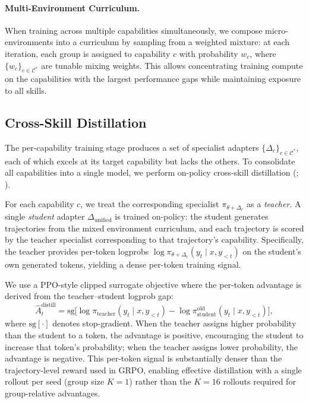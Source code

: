 \paragraph{Multi-Environment Curriculum.}
When training across multiple capabilities simultaneously, we compose
micro-environments into a curriculum by sampling from a weighted mixture:
at each iteration, each group is assigned to capability $c$ with
probability $w_c$, where
$\{w_c\}_{c \in \mathcal{C}^{*}}$ are tunable mixing weights.
This allows concentrating training compute on the capabilities with the
largest performance gaps while maintaining exposure to all skills.

\subsection{Cross-Skill Distillation}
\label{sec:distillation}

The per-capability training stage produces a set of specialist adapters
$\{\Delta_c\}_{c \in \mathcal{C}^{*}}$, each of which excels at its target
capability but lacks the others.  To consolidate all capabilities into a
single model, we perform on-policy cross-skill distillation
(\citealt{glm2025chatglm}; \citealt{skyrl2025}).

For each capability $c$, we treat the corresponding specialist
$\pi_{\theta + \Delta_c}$ as a \emph{teacher}.  A single \emph{student}
adapter $\Delta_{\text{unified}}$ is trained on-policy: the student generates
trajectories from the mixed environment curriculum, and each trajectory is
scored by the teacher specialist corresponding to that trajectory's capability.
Specifically, the teacher provides per-token logprobs
$\log \pi_{\theta+\Delta_c}(y_t \mid x, y_{<t})$
on the student's own generated tokens, yielding a dense per-token training
signal.

We use a PPO-style clipped surrogate objective where the per-token advantage
is derived from the teacher--student logprob gap:
\begin{equation}
    \hat{A}_t^{\text{distill}} =
        \text{sg}\!\bigl[\log \pi_{\text{teacher}}(y_t \mid x, y_{<t})
        - \log \pi_{\text{student}}^{\text{old}}(y_t \mid x, y_{<t})\bigr],
    \label{eq:distill}
\end{equation}
where $\text{sg}[\cdot]$ denotes stop-gradient.  When the teacher assigns
higher probability than the student to a token, the advantage is positive,
encouraging the student to increase that token's probability; when the teacher
assigns lower probability, the advantage is negative.  This per-token signal is
substantially denser than the trajectory-level reward used in GRPO, enabling
effective distillation with a single rollout per seed (group size $K{=}1$)
rather than the $K{=}16$ rollouts required for group-relative advantages.

